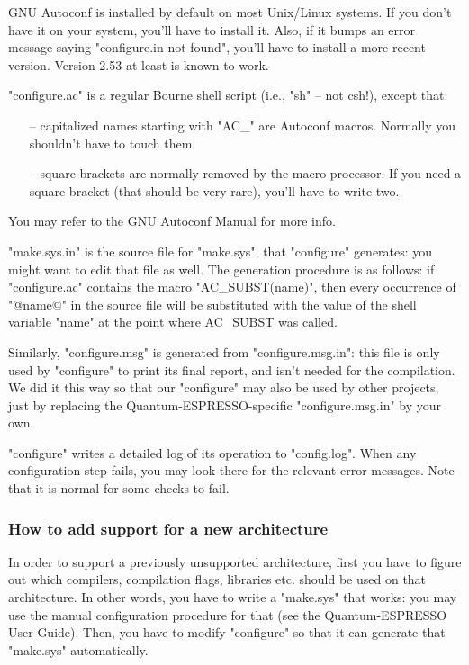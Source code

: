 \documentclass[12pt,a4paper]{article}
\begin{document}
GNU Autoconf is installed by default on most Unix/Linux systems.  If
you don't have it on your system, you'll have to install it.  Also, if
it bumps an error message saying "configure.in not found", you'll have
to install a more recent version.  Version 2.53 at least is known to
work.

"configure.ac" is a regular Bourne shell script (i.e., "sh" -- not csh!), 
except that:
\begin{itemize}
\item[--] capitalized names starting with "AC\_" are Autoconf macros.  Normally you shouldn't have to touch them.
\item[--] square brackets are normally removed by the macro processor.  If you need a square bracket (that should be very rare), you'll have to write two.
\end{itemize}

You may refer to the GNU Autoconf Manual for more info.

"make.sys.in" is the source file for "make.sys", that "configure"
generates: you might want to edit that file as well.  The generation
procedure is as follows: if "configure.ac" contains the macro
"AC\_SUBST(name)", then every occurrence of "@name@" in the source
file will be substituted with the value of the shell variable "name"
at the point where AC\_SUBST was called.

Similarly, "configure.msg" is generated from "configure.msg.in": this
file is only used by "configure" to print its final report, and isn't
needed for the compilation.  We did it this way so that our
"configure" may also be used by other projects, just by replacing the
Quantum-ESPRESSO-specific "configure.msg.in" by your own.

"configure" writes a detailed log of its operation to "config.log".
When any configuration step fails, you may look there for the relevant
error messages.  Note that it is normal for some checks to fail.

\subsubsection{How to add support for a new architecture}

In order to support a previously unsupported architecture, first you
have to figure out which compilers, compilation flags, libraries
etc. should be used on that architecture.
In other words, you have to write a "make.sys" that works: you may use
the manual configuration procedure for that (see the Quantum-ESPRESSO
User Guide).  Then, you have to modify "configure" so that it can
generate that "make.sys" automatically.
\end{document}
